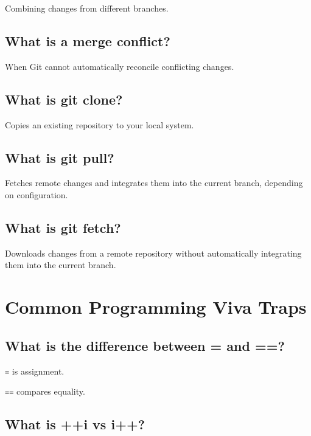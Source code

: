 Combining changes from different branches.

\medskip

\subsection{What is a merge conflict?}

When Git cannot automatically reconcile conflicting changes.

\medskip

\subsection{What is git clone?}

Copies an existing repository to your local system.

\medskip

\subsection{What is git pull?}

Fetches remote changes and integrates them into the current branch, depending on configuration.

\medskip

\subsection{What is git fetch?}

Downloads changes from a remote repository without automatically integrating them into the current branch.

\medskip

\section{Common Programming Viva Traps}

\subsection{What is the difference between = and ==?}

\texttt{=} is assignment.

\texttt{==} compares equality.

\medskip

\subsection{What is ++i vs i++?}

